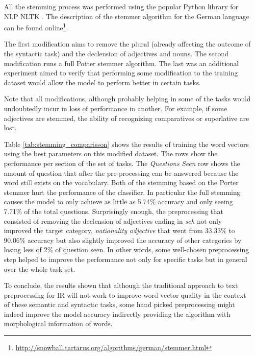 All the stemming process was performed using the popular Python library for
\ac{NLP}  \ac{NLTK} \cite{BirdKleinLoper09}. The
description of the stemmer algorithm for the German language can be found
online\footnote{\url{http://snowball.tartarus.org/algorithms/german/stemmer.html}}.

The first modification aims to remove the plural (already affecting the
outcome of the syntactic task) and the declension of adjectives and nouns.
The second modification runs a full Potter stemmer algorithm. The last was an
additional experiment aimed to verify that performing some modification to the
training dataset would allow the model to perform better in certain tasks.

Note that all modifications, although probably helping in some of the tasks
would undoubtedly incur in loss of performance in another. For example, if
some adjectives are stemmed, the ability of recognizing comparatives or
superlative are lost.

Table \ref{tab:stemming_comparisson} shows the results of training the word vectors
using the  best parameters on this modified dataset.  The rows show the
performance per section of the set of tasks. The \textit{Questions Seen} row
shows the amount of question that after the pre-processing can be answered
because the word still exists on the vocabulary. 
Both of the stemming based on the Porter stemmer hurt the performance of the classifier. In particular the full stemming causes the model to only
achieve as little as 5.74\% accuracy and only seeing 7.71\% of the total
questions. Surprisingly enough, the preprocessing that consisted of removing
the declension of adjectives  ending in \textit{sch} not only
improved the target category, \textit{nationality adjective} that went from
33.33\% to 90.06\% accuracy but also slightly improved the accuracy of other
categories by losing less of 2\% of question seen. In other words, some
well-chosen preprocessing  step helped to improve the performance not only
for specific tasks but in general over the whole task set.

To conclude, the results shown that although the traditional approach to text
preprocessing for \ac{IR} will not work to improve word vector quality in the
context of these semantic and syntactic tasks,  some hand picked
preprocessing might indeed improve the  model accuracy indirectly providing
the algorithm with morphological information  of words.


